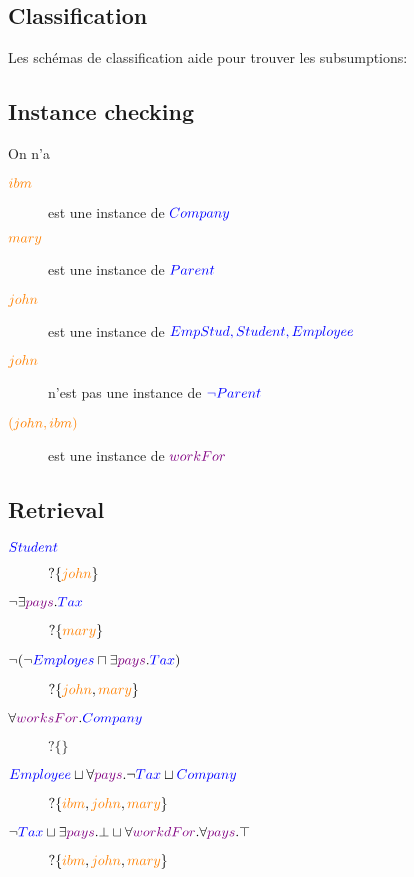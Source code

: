 \subsection{Classification}
Les schémas de classification aide pour trouver les subsumptions:


\subsection{Instance checking}
On n'a
\begin{description}
\item[$\textcolor{orange}{ibm}$] est une instance de $\textcolor{blue}{Company}$
\item[$\textcolor{orange}{mary}$] est une instance de $\textcolor{blue}{Parent}$
\item[$\textcolor{orange}{john}$] est une instance de $\textcolor{blue}{EmpStud, Student, Employee}$
\item[$\textcolor{orange}{john}$] n'est pas une instance de $\textcolor{blue}{\neg Parent}$
\item[$\textcolor{orange}{(john,ibm)}$] est une instance de $\textcolor{violet}{workFor}$
\end{description}

\subsection{Retrieval}
\begin{description}
\item[$\textcolor{blue}{Student}$] $? \{ \textcolor{orange}{john} \}$
\item[$\neg \exists \textcolor{violet}{pays}.\textcolor{blue}{Tax}$] $? \{ \textcolor{orange}{mary} \}$
\item[$\neg ( \neg \textcolor{blue}{Employes} \sqcap \exists \textcolor{violet}{pays}.\textcolor{blue}{Tax})$] $? \{ \textcolor{orange}{john}, \textcolor{orange}{mary} \}$
\item[$\forall \textcolor{violet}{worksFor}.\textcolor{blue}{Company}$] $? \{ \}$
\item[$\textcolor{blue}{Employee} \sqcup \forall \textcolor{violet}{pays} . \neg \textcolor{blue}{Tax} \sqcup \textcolor{blue}{Company}$] $? \{ \textcolor{orange}{ibm}, \textcolor{orange}{john}, \textcolor{orange}{mary} \}$
\item[$\neg \textcolor{blue}{Tax} \sqcup \exists \textcolor{violet}{pays} . \bot \sqcup \forall \textcolor{violet}{workdFor} . \forall \textcolor{violet}{pays} . \top$] $? \{ \textcolor{orange}{ibm}, \textcolor{orange}{john}, \textcolor{orange}{mary} \}$
\end{description}

